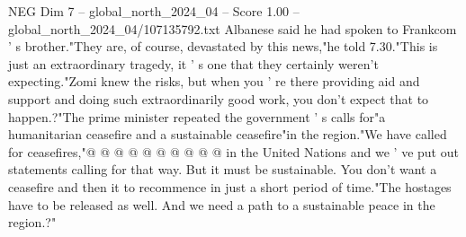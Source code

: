 \begin{textsample}{NEG Dim 7 – global\_north\_2024\_04 – Score 1.00 – global\_north\_2024\_04/107135792.txt}
Albanese said he had spoken to Frankcom ' s brother."They are, of course, devastated by this news,"he told 7.30."This is just an extraordinary tragedy, it ' s one that they certainly weren't expecting."Zomi knew the risks, but when you ' re there providing aid and support and doing such extraordinarily good work, you don't expect that to happen.?"The prime minister repeated the government ' s calls for"a humanitarian ceasefire and a sustainable ceasefire"in the region."We have called for ceasefires,"@ @ @ @ @ @ @ @ @ @ in the United Nations and we ' ve put out statements calling for that way.
But it must be sustainable.
You don't want a ceasefire and then it to recommence in just a short period of time."The hostages have to be released as well.
And we need a path to a sustainable peace in the region.?"

\end{textsample}
